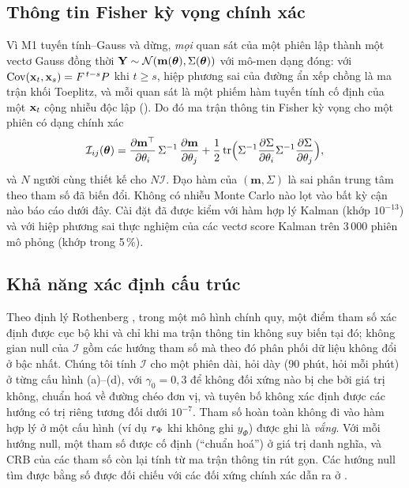 \subsection{Thông tin Fisher kỳ vọng chính xác}
\label{sec:fisher}

Vì M1 tuyến tính--Gauss và dừng, \emph{mọi} quan sát của một phiên lập thành một vectơ Gauss đồng thời $\mathbf Y\sim\mathcal N(\mathbf m(\boldsymbol{\theta}),\Sigma(\boldsymbol{\theta}))$ với mô-men dạng đóng: với $\operatorname{Cov}(\mathbf{x}_t,\mathbf{x}_s)=F^{\,t-s}P$ khi $t\ge s$, hiệp phương sai của đường ẩn xếp chồng là ma trận khối Toeplitz, và mỗi quan sát là một phiếm hàm tuyến tính cố định của một $\mathbf{x}_t$ cộng nhiễu độc lập (). Do đó ma trận thông tin Fisher kỳ vọng cho một phiên có dạng chính xác
\begin{equation}
  \mathcal I_{ij}(\boldsymbol{\theta})=\pdv{\mathbf m^\top}{\theta_i}\,\Sigma^{-1}\,\pdv{\mathbf m}{\theta_j}
  +\frac12\operatorname{tr}\Bigl(\Sigma^{-1}\pdv{\Sigma}{\theta_i}\Sigma^{-1}\pdv{\Sigma}{\theta_j}\Bigr),
  \label{eq:fisher}
\end{equation}
và $N$ người cùng thiết kế cho $N\mathcal I$. Đạo hàm của $(\mathbf m,\Sigma)$ là sai phân trung tâm theo tham số đã biến đổi. Không có nhiễu Monte Carlo nào lọt vào bất kỳ cận nào báo cáo dưới đây. Cài đặt đã được kiểm với hàm hợp lý Kalman (khớp $10^{-13}$) và với hiệp phương sai thực nghiệm của các vectơ score Kalman trên 3\,000 phiên mô phỏng (khớp trong 5\,\%).

\subsection{Khả năng xác định cấu trúc}
\label{sec:structural}

Theo định lý Rothenberg \citep{Rothenberg1971}, trong một mô hình chính quy, một điểm tham số xác định được cục bộ khi và chỉ khi ma trận thông tin không suy biến tại đó; không gian null của $\mathcal I$ gồm các hướng tham số mà theo đó phân phối dữ liệu không đổi ở bậc nhất. Chúng tôi tính $\mathcal I$ cho một phiên dài, hỏi dày (90 phút, hỏi mỗi phút) ở từng cấu hình (a)--(d), với $\gamma_0=0{,}3$ để không đối xứng nào bị che bởi giá trị không, chuẩn hoá về đường chéo đơn vị, và tuyên bố không xác định được các hướng có trị riêng tương đối dưới $10^{-7}$. Tham số hoàn toàn không đi vào hàm hợp lý ở một cấu hình (ví dụ $r_{\Phi}$ khi không ghi $y_\Phi$) được ghi là \emph{vắng}. Với mỗi hướng null, một tham số được cố định (``chuẩn hoá'') ở giá trị danh nghĩa, và CRB của các tham số còn lại tính từ ma trận thông tin rút gọn. Các hướng null tìm được bằng số được đối chiếu với các đối xứng chính xác dẫn ra ở .

